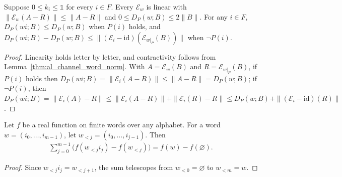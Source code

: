 \begin{lemma}
    \label{thm:al_channel_word_omission_bounds}
    \leanok
    Suppose $0\le k_i\le\mathbb 1$ for every $i\in F$. Every $\mathcal E_w$ is
    linear with $\|\mathcal E_w(A-R)\|\le\|A-R\|$ and
    $0\le D_P(w;B)\le2\|B\|$. For any $i\in F$, $D_P(wi;B)\le D_P(w;B)$ when
    $P(i)$ holds, and
    $D_P(wi;B)-D_P(w;B)\le\|(\mathcal E_i-\mathrm{id})(\mathcal E_{w|_P}(B))\|$
    when $\neg P(i)$.
\end{lemma}
\begin{proof}\leanok
    Linearity holds letter by letter, and contractivity follows from
    Lemma~\ref{thm:al_channel_word_norm}. With $A=\mathcal E_w(B)$ and
    $R=\mathcal E_{w|_P}(B)$, if $P(i)$ holds then
    $D_P(wi;B)=\|\mathcal E_i(A-R)\|\le\|A-R\|=D_P(w;B)$; if $\neg P(i)$, then
    $D_P(wi;B)=\|\mathcal E_i(A)-R\|\le\|\mathcal E_i(A-R)\|+\|\mathcal E_i(R)-R\|
        \le D_P(w;B)+\|(\mathcal E_i-\mathrm{id})(R)\|$.
\end{proof}

\begin{lemma}
    \label{thm:al_poisson_prefix_increment}
    \leanok
    Let $f$ be a real function on finite words over any alphabet. For a word
    $w=(i_0,\ldots,i_{m-1})$, let $w_{<j}=(i_0,\ldots,i_{j-1})$. Then
    \begin{align}
        \sum_{j=0}^{m-1}\bigl(f(w_{<j}i_j)-f(w_{<j})\bigr)
        =f(w)-f(\varnothing).
        \label{eq:al_poisson_prefix_increment}
    \end{align}
\end{lemma}
\begin{proof}\leanok
    Since $w_{<j}i_j=w_{<j+1}$, the sum telescopes from $w_{<0}=\varnothing$ to
    $w_{<m}=w$.
\end{proof}

